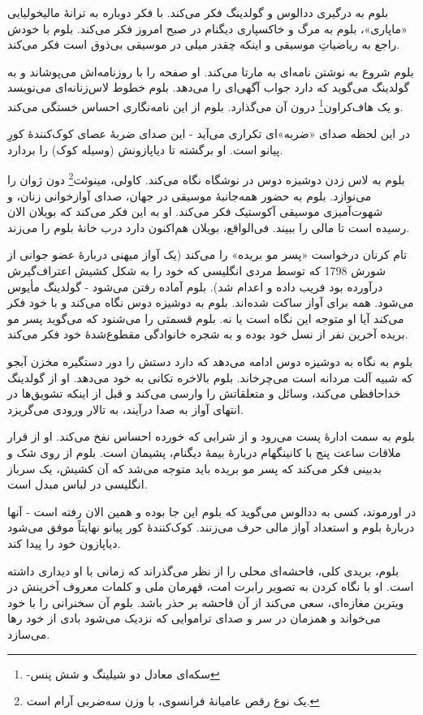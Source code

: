 \documentclass[12pt]{book}
\begin{document}
    بلوم به درگیری ددالوس و گولدینگ فکر می‌کند. با فکر دوباره به ترانۀ مالیخولیایی «ماپاری»، بلوم به مرگ و خاکسپاری دیگنام در صبح امروز فکر می‌کند. بلوم با خودش راجع به ریاضیاتِ موسیقی و اینکه چقدر میلی در موسیقی بی‌ذوق است فکر می‌کند.

    بلوم شروع به نوشتن نامه‌ای به مارتا می‌کند. او صفحه را با روزنامه‌اش می‌پوشاند و به گولدینگ می‌گوید که دارد جواب آگهی‌ای را می‌دهد. بلوم خطوط لاس‌زنانه‌ای می‌نویسد و یک هاف‌کراون\footnote{-سکه‌ای معادل دو شیلینگ و شش پنس} درون آن می‌گذارد. بلوم از این نامه‌نگاری احساس خستگی می‌کند.

    در این لحظه صدای «ضربه»‌ای تکراری می‌آید - این صدای ضربۀ عصای کوک‌کنندۀ کورِ پیانو است. او برگشته تا دیاپازونش (وسیله کوک) را بردارد.

    بلوم به لاس زدن دوشیزه دوس در نوشگاه نگاه می‌کند. کاولی، مینوئت\footnote{یک نوع رقص عامیانۀ فرانسوی، با وزن سه‌ضربی آرام است.} دون ژوان را می‌نوازد. بلوم به حضور همه‌جانبۀ موسیقی در جهان، صدای آوازخوانی زنان، و شهوت‌آمیزی موسیقی آکوستیک فکر می‌کند. او به این فکر می‌کند که بویلان الان رسیده است تا مالی را ببیند. فی‌الواقع، بویلان هم‌اکنون دارد درب خانۀ بلوم را می‌زند.

    تام کرنان درخواست «پسر مو بریده» را می‌کند (یک آواز میهنی دربارۀ عضو جوانی از شورش 1798 که توسط مردی انگلیسی که خود را به شکل کشیش اعتراف‌گیرش درآورده بود فریب داده و اعدام شد). بلوم آماده رفتن می‌شود - گولدینگ مأیوس می‌شود. همه برای آواز ساکت شده‌اند. بلوم به دوشیزه دوس نگاه می‌کند و با خود فکر می‌کند آیا او متوجه این نگاه است یا نه. بلوم قسمتی را می‌شنود که می‌گوید پسر مو بریده آخرین نفر از نسل خود بوده و به شجره خانوادگی مقطوع‌شدۀ خود فکر می‌کند.

    بلوم به نگاه به دوشیزه دوس ادامه می‌دهد که دارد دستش را دور دستگیره مخزن آبجو که شبیه آلت مردانه است می‌چرخاند. بلوم بالاخره تکانی به خود می‌دهد. او از گولدینگ خداحافظی می‌کند، وسائل و متعلقاتش را وارسی می‌کند و قبل از اینکه تشویق‌ها در انتهای آواز به صدا درآیند، به تالار ورودی می‌گریزد.

    بلوم به سمت ادارۀ پست می‌رود و از شرابی که خورده احساس نفخ می‌کند. او از قرار ملاقات ساعت پنج با کانینگهام دربارۀ بیمۀ دیگنام، پشیمان است. بلوم از روی شک و بدبینی فکر می‌کند که پسر مو بریده باید متوجه می‌شد که آن کشیش، یک سرباز انگلیسی در لباس مبدل است.

    در اورموند، کسی به ددالوس می‌گوید که بلوم این جا بوده و همین الان رفته است - آنها دربارۀ بلوم و استعداد آواز مالی حرف می‌زنند. کوک‌کنندۀ کور پیانو نهایتاً موفق می‌شود دیاپازون خود را پیدا کند.

    بلوم، بریدی کلی، فاحشه‌ای محلی را از نظر می‌گذراند که زمانی با او دیداری داشته است. او با نگاه کردن به تصویر رابرت امت، قهرمان ملی و کلمات معروف آخرینش در ویترین مغازه‌ای، سعی می‌کند از آن فاحشه بر حذر باشد. بلوم آن سخنرانی را با خود می‌خواند و همزمان در سر و صدای تراموایی که نزدیک می‌شود بادی از خود رها می‌سازد.
\end{document}
